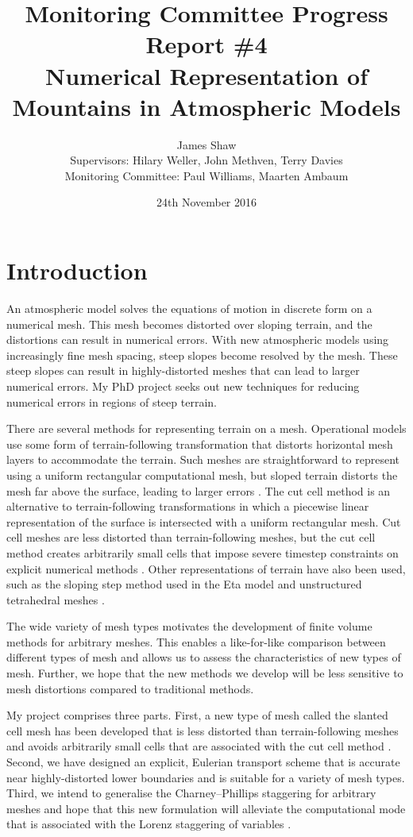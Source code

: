 \documentclass[a4paper,11pt]{article}
\title{
\vspace*{-2em}
Monitoring Committee Progress Report \#4\\
\vspace*{1em}
\Large{Numerical Representation of Mountains in Atmospheric Models}}
\author{James Shaw
\vspace{0.5em} \\
\large{Supervisors: Hilary Weller, John Methven, Terry Davies}
\vspace{0.5em} \\
\large{Monitoring Committee: Paul Williams, Maarten Ambaum}}
\date{24th November 2016}
\begin{document}
\maketitle

\section{Introduction}

An atmospheric model solves the equations of motion in discrete form on a numerical mesh.  This mesh becomes distorted over sloping terrain, and the distortions can result in numerical errors.  With new atmospheric models using increasingly fine mesh spacing, steep slopes become resolved by the mesh.  These steep slopes can result in highly-distorted meshes that can lead to larger numerical errors.  My PhD project seeks out new techniques for reducing numerical errors in regions of steep terrain.

There are several methods for representing terrain on a mesh.  Operational models use some form of terrain-following transformation that distorts horizontal mesh layers to accommodate the terrain.  Such meshes are straightforward to represent using a uniform rectangular computational mesh, but sloped terrain distorts the mesh far above the surface, leading to larger errors \citep{schaer2002,klemp2011}.  The cut cell method is an alternative to terrain-following transformations in which a piecewise linear representation of the surface is intersected with a uniform rectangular mesh.  Cut cell meshes are less distorted than terrain-following meshes, but the cut cell method creates arbitrarily small cells that impose severe timestep constraints on explicit numerical methods \citep{klein2009}.  Other representations of terrain have also been used, such as the sloping step method used in the Eta model \citep{mesinger2012} and unstructured tetrahedral meshes \citep{smolarkiewicz-szmelter2011}.

The wide variety of mesh types motivates the development of finite volume methods for arbitrary meshes.  This enables a like-for-like comparison between different types of mesh and allows us to assess the characteristics of new types of mesh.  Further, we hope that the new methods we develop will be less sensitive to mesh distortions compared to traditional methods.

My project comprises three parts.  First, a new type of mesh called the slanted cell mesh has been developed that is less distorted than terrain-following meshes and avoids arbitrarily small cells that are associated with the cut cell method \citep{shaw-weller2016}.  Second, we have designed an explicit, Eulerian transport scheme that is accurate near highly-distorted lower boundaries and is suitable for a variety of mesh types.  Third, we intend to generalise the Charney--Phillips staggering for arbitrary meshes and hope that this new formulation will alleviate the computational mode that is associated with the Lorenz staggering of variables \citep{arakawa-konor1996}.
\end{document}
